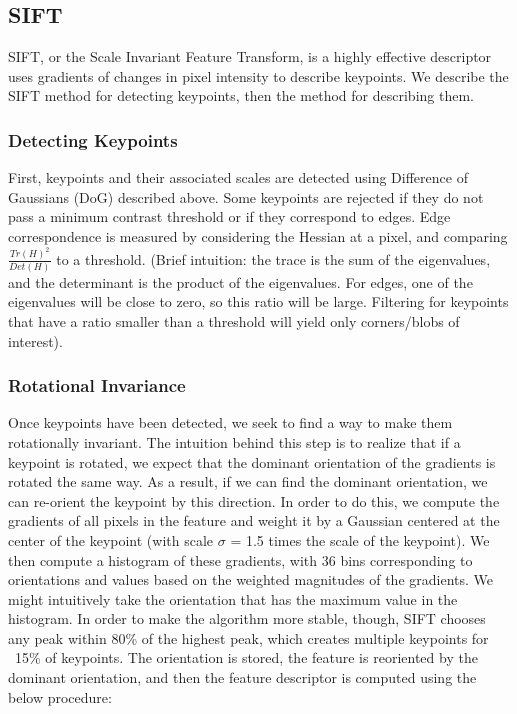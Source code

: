 \documentclass[a4paper, 12pt]{article}
\numberwithin{equation}{section}
\begin{document}
\subsection{SIFT}
SIFT, or the Scale Invariant Feature Transform, is a highly effective descriptor uses gradients of changes in pixel intensity to describe keypoints. We describe the SIFT method for detecting keypoints, then the method for describing them.

\subsubsection{Detecting Keypoints}
First, keypoints and their associated scales are detected using Difference of Gaussians (DoG) described above. Some keypoints are rejected if they do not pass a minimum contrast threshold or if they correspond to edges. Edge correspondence is measured by considering the Hessian at a pixel, and comparing $\frac{Tr(H)^2}{Det(H)}$ to a threshold. (Brief intuition: the trace is the sum of the eigenvalues, and the determinant is the product of the eigenvalues. For edges, one of the eigenvalues will be close to zero, so this ratio will be large. Filtering for keypoints that have a ratio smaller than a threshold will yield only corners/blobs of interest). 

\subsubsection{Rotational Invariance}
Once keypoints have been detected, we seek to find a way to make them rotationally invariant. The intuition behind this step is to realize that if a keypoint is rotated, we expect that the dominant orientation of the gradients is rotated the same way. As a result, if we can find the dominant orientation, we can re-orient the keypoint by this direction. In order to do this, we compute the gradients of all pixels in the feature and weight it by a Gaussian centered at the center of the keypoint (with scale $\sigma$ = 1.5 times the scale of the keypoint). We then compute a histogram of these gradients, with 36 bins corresponding to orientations and values based on the weighted magnitudes of the gradients. We might intuitively take the orientation that has the maximum value in the histogram. In order to make the algorithm more stable, though, SIFT chooses any peak within 80\% of the highest peak, which creates multiple keypoints for ~15\% of keypoints. The orientation is stored, the feature is reoriented by the dominant orientation, and then the feature descriptor is computed using the below procedure: 
\end{document}
